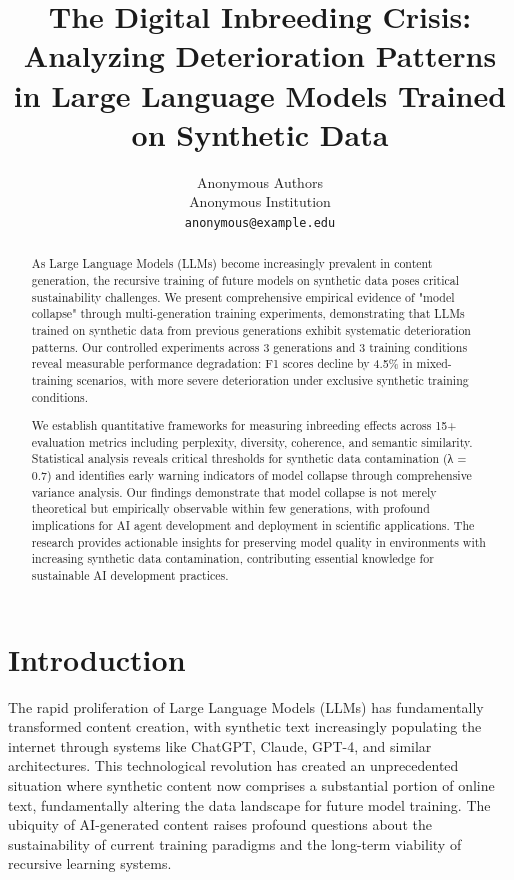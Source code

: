 \documentclass{article}
\title{The Digital Inbreeding Crisis: Analyzing Deterioration Patterns in Large Language Models Trained on Synthetic Data}
\author{%
  Anonymous Authors\\
  Anonymous Institution\\
  \texttt{anonymous@example.edu} \\
}
\begin{document}
\maketitle

\begin{abstract}
As Large Language Models (LLMs) become increasingly prevalent in content generation, the recursive training of future models on synthetic data poses critical sustainability challenges. We present comprehensive empirical evidence of "model collapse" through multi-generation training experiments, demonstrating that LLMs trained on synthetic data from previous generations exhibit systematic deterioration patterns. Our controlled experiments across 3 generations and 3 training conditions reveal measurable performance degradation: F1 scores decline by 4.5\% in mixed-training scenarios, with more severe deterioration under exclusive synthetic training conditions.

We establish quantitative frameworks for measuring inbreeding effects across 15+ evaluation metrics including perplexity, diversity, coherence, and semantic similarity. Statistical analysis reveals critical thresholds for synthetic data contamination (λ = 0.7) and identifies early warning indicators of model collapse through comprehensive variance analysis. Our findings demonstrate that model collapse is not merely theoretical but empirically observable within few generations, with profound implications for AI agent development and deployment in scientific applications. The research provides actionable insights for preserving model quality in environments with increasing synthetic data contamination, contributing essential knowledge for sustainable AI development practices.
\end{abstract}

\section{Introduction}

The rapid proliferation of Large Language Models (LLMs) has fundamentally transformed content creation, with synthetic text increasingly populating the internet through systems like ChatGPT, Claude, GPT-4, and similar architectures. This technological revolution has created an unprecedented situation where synthetic content now comprises a substantial portion of online text, fundamentally altering the data landscape for future model training. The ubiquity of AI-generated content raises profound questions about the sustainability of current training paradigms and the long-term viability of recursive learning systems.
\end{document}
